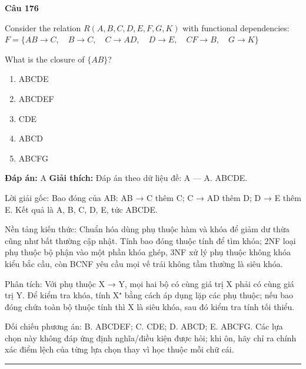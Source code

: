 \documentclass[11pt,a4paper]{article}
\newenvironment{question}[1]{%
  \par\vspace{1em}\noindent\textbf{\large Câu #1}\par\vspace{0.4em}
}{%
  \par\vspace{1em}\hrule\vspace{0.6em}
}
\newenvironment{choices}{%
  \begin{enumerate}[label=\textbf{\Alph*.},leftmargin=2.2em,itemsep=2pt,topsep=3pt]
}{%
  \end{enumerate}
}
\newcommand{\choice}{\item}
\begin{document}
\begin{question}{176}
Consider the relation \(R(A, B, C, D, E, F, G, K)\) with functional dependencies:
\(F = \{ AB \rightarrow C, \quad B \rightarrow C, \quad C \rightarrow AD, \quad D \rightarrow E, \quad CF \rightarrow B, \quad G \rightarrow K \}\)

What is the closure of \(\{AB\}\)?
\begin{choices}
\choice ABCDE
\choice ABCDEF
\choice CDE
\choice ABCD
\choice ABCFG
\end{choices}
\textbf{Đáp án:} A
\textbf{Giải thích:} Đáp án theo dữ liệu đề: A — A. {ABCDE}.

Lời giải gốc: Bao đóng của {AB}: AB → C thêm C; C → AD thêm D; D → E thêm E. Kết quả là {A, B, C, D, E}, tức {ABCDE}.

Nền tảng kiến thức: Chuẩn hóa dùng phụ thuộc hàm và khóa để giảm dư thừa cũng như bất thường cập nhật. Tính bao đóng thuộc tính để tìm khóa; 2NF loại phụ thuộc bộ phận vào một phần khóa ghép, 3NF xử lý phụ thuộc không khóa kiểu bắc cầu, còn BCNF yêu cầu mọi vế trái không tầm thường là siêu khóa.

Phân tích: Với phụ thuộc X → Y, mọi hai bộ có cùng giá trị X phải có cùng giá trị Y. Để kiểm tra khóa, tính X⁺ bằng cách áp dụng lặp các phụ thuộc; nếu bao đóng chứa toàn bộ thuộc tính thì X là siêu khóa, sau đó kiểm tra tính tối thiểu.

Đối chiếu phương án: B. {ABCDEF}; C. {CDE}; D. {ABCD}; E. {ABCFG}. Các lựa chọn này không đáp ứng định nghĩa/điều kiện được hỏi; khi ôn, hãy chỉ ra chính xác điểm lệch của từng lựa chọn thay vì học thuộc mỗi chữ cái.
\end{question}
\end{document}
